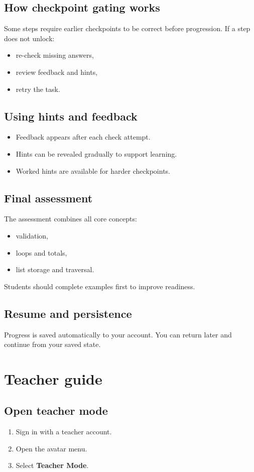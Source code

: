 \documentclass[11pt,a4paper]{article}
\begin{document}
\subsection{How checkpoint gating works}
Some steps require earlier checkpoints to be correct before progression.
If a step does not unlock:
\begin{itemize}
  \item re-check missing answers,
  \item review feedback and hints,
  \item retry the task.
\end{itemize}

\subsection{Using hints and feedback}
\begin{itemize}
  \item Feedback appears after each check attempt.
  \item Hints can be revealed gradually to support learning.
  \item Worked hints are available for harder checkpoints.
\end{itemize}

\subsection{Final assessment}
The assessment combines all core concepts:
\begin{itemize}
  \item validation,
  \item loops and totals,
  \item list storage and traversal.
\end{itemize}

Students should complete examples first to improve readiness.

\subsection{Resume and persistence}
Progress is saved automatically to your account.
You can return later and continue from your saved state.

\section{Teacher guide}
\subsection{Open teacher mode}
\begin{enumerate}
  \item Sign in with a teacher account.
  \item Open the avatar menu.
  \item Select \textbf{Teacher Mode}.
\end{enumerate}
\end{document}
